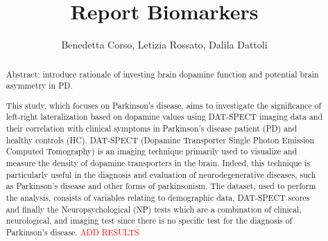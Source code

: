\documentclass[]{article}
\title{Report Biomarkers}
\author{Benedetta Corso, Letizia Rossato, Dalila Dattoli}
\begin{document}
\maketitle

\begin{abstract}
Abstract: introduce rationale of investing brain dopamine function and potential brain asymmetry in PD.

This study, which focuses on Parkinson's disease, aims to investigate the significance of left-right lateralization based on dopamine values using DAT-SPECT imaging data and their correlation with clinical symptoms in Parkinson’s disease patient (PD) and healthy controls (HC). DAT-SPECT (Dopamine Transporter Single Photon Emission Computed Tomography) is an imaging technique primarily used to visualize and measure the density of dopamine transporters in the brain.  Indeed, this technique is particularly useful in the diagnosis and evaluation of neurodegenerative diseases, such as Parkinson's disease and other forms of parkinsonism. The dataset, used to perform the analysis, consists of variables relating to demographic data, DAT-SPECT scores and finally the Neuropsychological (NP) tests which are a combination of clinical, neurological, and imaging test since there is no specific test for the diagnosis of Parkinson’s disease. 
\newline
\textcolor{red}{ADD RESULTS}
\newline

\end{abstract}
\end{document}
